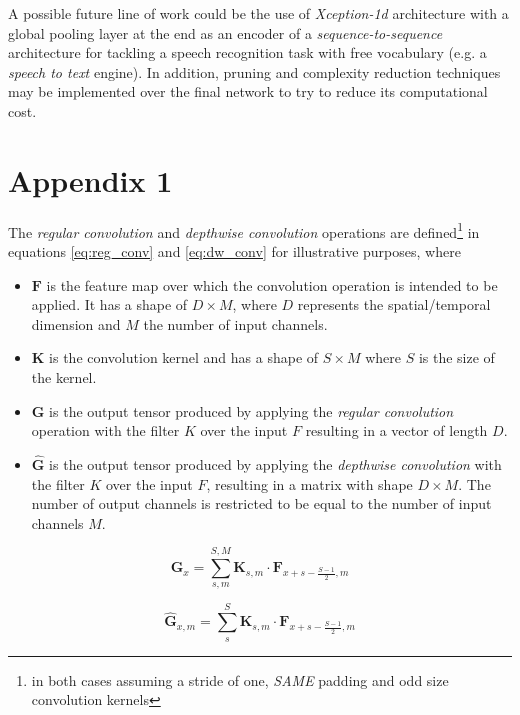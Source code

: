 A possible future line of work could be  the use of \textit{Xception-1d} architecture with a global pooling layer at the end  as an encoder of a \textit{sequence-to-sequence} architecture for tackling a speech recognition task with free vocabulary (e.g. a \textit{speech to text} engine). In addition, pruning and complexity reduction techniques may be implemented over the final network to try to reduce its computational cost.


\section*{Appendix 1}
The \textit{regular convolution} and \textit{depthwise convolution} operations \cite{Howard2017}  are defined\footnote{in both cases assuming a stride of one, \textit{SAME} padding and odd size convolution kernels} in equations \ref{eq:reg_conv} and  \ref{eq:dw_conv} for illustrative purposes, where 

\begin{itemize}
	\item $\mathbf{F}$ is the feature map over which the convolution operation is intended to be applied. It has a shape of $D \times M$, where $D$ represents the spatial/temporal dimension and $M$ the number of input channels.
	\item $\mathbf{K}$ is the convolution kernel and has a shape of $S \times M$ where $S$ is the size of the kernel.
	\item $\mathbf{G}$ is the output tensor produced by applying the \textit{regular convolution} operation with the filter $K$ over the input $F$ resulting in a vector of length $D$.
	\item $\hat{\mathbf{G}}$ is the output tensor produced by applying the \textit{depthwise convolution} with the filter $K$ over the input $F$, resulting in a matrix with shape $D \times M$. The number of output channels is restricted to be equal to the number of input channels $M$. 
\end{itemize}


\begin{equation}
\mathbf{G}_{x} = \sum_{s, m}^{S,M} \mathbf{K}_{s, m} \cdot \mathbf{F}_{x+s-\frac{S-1}{2}, m}
\label{eq:reg_conv}
\end{equation}

\begin{equation}
\hat{\mathbf{G}}_{x, m} = \sum_{s}^{S} \mathbf{K}_{s, m} \cdot \mathbf{F}_{x+s-\frac{S-1}{2}, m} 
\label{eq:dw_conv}
\end{equation}

